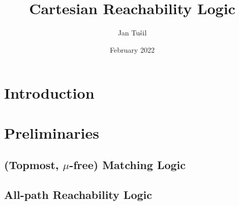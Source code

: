 \documentclass{article}
\title{Cartesian Reachability Logic}
\author{Jan Tušil }
\date{February 2022}
\begin{document}
\maketitle

\section{Introduction}

\section{Preliminaries}

\subsection{(Topmost, $\mu$-free) Matching Logic}

\subsection{All-path Reachability Logic}
\end{document}
